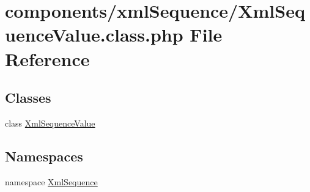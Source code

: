 \hypertarget{_xml_sequence_value_8class_8php}{
\section{components/xmlSequence/XmlSequenceValue.class.php File Reference}
\label{_xml_sequence_value_8class_8php}
}
\subsection*{Classes}
\begin{CompactItemize}
\item 
class \hyperlink{class_xml_sequence_value}{XmlSequenceValue}
\end{CompactItemize}
\subsection*{Namespaces}
\begin{CompactItemize}
\item 
namespace \hyperlink{namespace_xml_sequence}{XmlSequence}
\end{CompactItemize}
